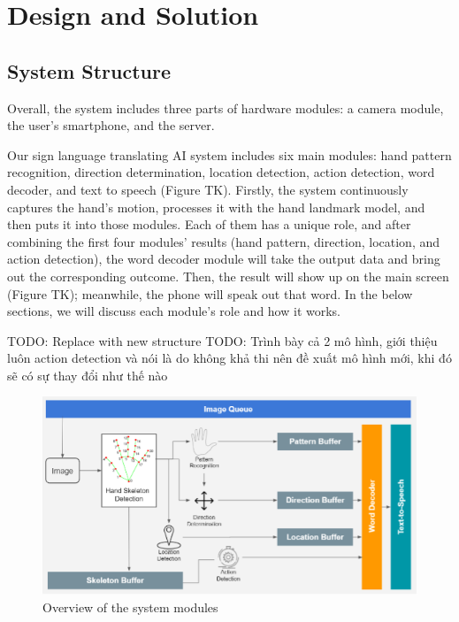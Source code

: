 \chapter{Design and Solution}

\section{System Structure}
Overall, the system includes three parts of hardware modules: a camera module, the user's smartphone, and the server.

Our sign language translating AI system includes six main modules: hand pattern recognition, direction determination, location detection, action detection, word decoder, and text to speech (Figure TK). Firstly, the system continuously captures the hand's motion, processes it with the hand landmark model, and then puts it into those modules. Each of them has a unique role, and after combining the first four modules' results (hand pattern, direction, location, and action detection), the word decoder module will take the output data and bring out the corresponding outcome. Then, the result will show up on the main screen (Figure TK); meanwhile, the phone will speak out that word. In the below sections, we will discuss each module's role and how it works.

TODO: Replace with new structure
TODO: Trình bày cả 2 mô hình, giới thiệu luôn action detection và nói là do không khả thi nên đề xuất mô hình mới, khi đó sẽ có sự thay đổi như thế nào 

\begin{figure}[H]
	\centering
	\includegraphics[width=\textwidth]{img/Chap4/OverviewOfTheSystemModules.png}
	\caption{Overview of the system modules}
	\label{fig:Chap4-OverviewOfTheSystemModules}
\end{figure}

